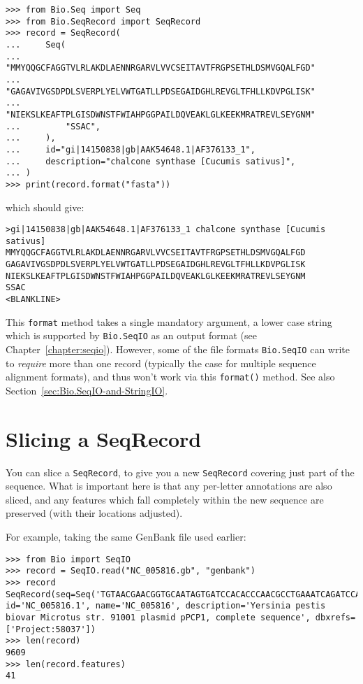 \begin{verbatim}
>>> from Bio.Seq import Seq
>>> from Bio.SeqRecord import SeqRecord
>>> record = SeqRecord(
...     Seq(
...         "MMYQQGCFAGGTVLRLAKDLAENNRGARVLVVCSEITAVTFRGPSETHLDSMVGQALFGD"
...         "GAGAVIVGSDPDLSVERPLYELVWTGATLLPDSEGAIDGHLREVGLTFHLLKDVPGLISK"
...         "NIEKSLKEAFTPLGISDWNSTFWIAHPGGPAILDQVEAKLGLKEEKMRATREVLSEYGNM"
...         "SSAC",
...     ),
...     id="gi|14150838|gb|AAK54648.1|AF376133_1",
...     description="chalcone synthase [Cucumis sativus]",
... )
>>> print(record.format("fasta"))
\end{verbatim}
\noindent which should give:
\begin{verbatim}
>gi|14150838|gb|AAK54648.1|AF376133_1 chalcone synthase [Cucumis sativus]
MMYQQGCFAGGTVLRLAKDLAENNRGARVLVVCSEITAVTFRGPSETHLDSMVGQALFGD
GAGAVIVGSDPDLSVERPLYELVWTGATLLPDSEGAIDGHLREVGLTFHLLKDVPGLISK
NIEKSLKEAFTPLGISDWNSTFWIAHPGGPAILDQVEAKLGLKEEKMRATREVLSEYGNM
SSAC
<BLANKLINE>
\end{verbatim}

This \verb|format| method takes a single mandatory argument, a lower case string which is
supported by \verb|Bio.SeqIO| as an output format (see Chapter~\ref{chapter:seqio}).
However, some of the file formats \verb|Bio.SeqIO| can write to \emph{require} more than
one record (typically the case for multiple sequence alignment formats), and thus won't
work via this \verb|format()| method.  See also Section~\ref{sec:Bio.SeqIO-and-StringIO}.

\section{Slicing a SeqRecord}
\label{sec:SeqRecord-slicing}

You can slice a \verb|SeqRecord|, to give you a new \verb|SeqRecord| covering just
part of the sequence. What is important
here is that any per-letter annotations are also sliced, and any features which fall
completely within the new sequence are preserved (with their locations adjusted).

For example, taking the same GenBank file used earlier:

\begin{verbatim}
>>> from Bio import SeqIO
>>> record = SeqIO.read("NC_005816.gb", "genbank")
>>> record
SeqRecord(seq=Seq('TGTAACGAACGGTGCAATAGTGATCCACACCCAACGCCTGAAATCAGATCCAGG...CTG'), id='NC_005816.1', name='NC_005816', description='Yersinia pestis biovar Microtus str. 91001 plasmid pPCP1, complete sequence', dbxrefs=['Project:58037'])
>>> len(record)
9609
>>> len(record.features)
41
\end{verbatim}


